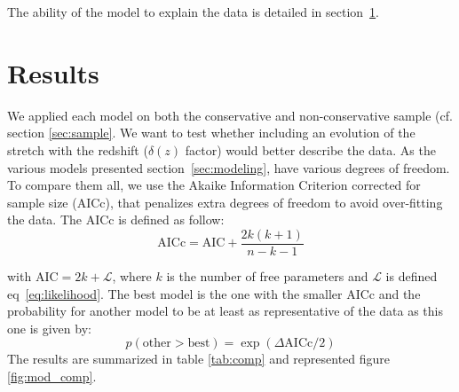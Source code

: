 \documentclass[]{aa} %
\begin{document}
The ability of the model to explain the data is detailed in
section~\ref{sec:results}.

\section{Results}
\label{sec:results}

We applied each model on both the conservative and non-conservative sample (cf.
section \ref{sec:sample}. We want to test whether including an evolution of the
stretch with the redshift ($\delta(z)$ factor) would better describe the data.
As the various models presented section~\ref{sec:modeling}, have various degrees
of freedom. To compare them all, we use the Akaike Information Criterion
corrected for sample size (AICc), that penalizes extra degrees of freedom to
avoid over-fitting the data. The AICc is defined as follow:
\begin{equation}
    \mathrm{AICc} = \mathrm{AIC} + \frac{2k\left(k+1\right)}{n - k - 1}
\end{equation}

with $\mathrm{AIC} = 2k + \mathcal{L}$, where $k$ is the number of free
parameters and $\mathcal{L}$ is defined eq~\eqref{eq:likelihood}.  The best
model is the one with the smaller AICc and the probability for another model to
be at least as representative of the data as this one is given by:
\begin{equation}
    p(\mathrm{other} > \mathrm{best}) = \exp\left(\Delta\mathrm{AICc}/2\right)
\end{equation}
The results are summarized in table \ref{tab:comp} and represented figure
\ref{fig:mod_comp}.
\end{document}
